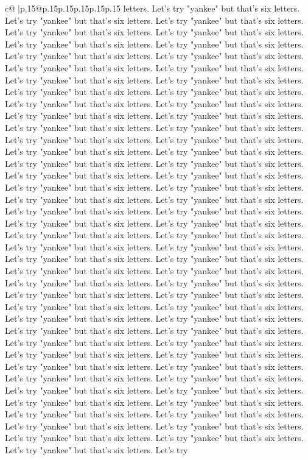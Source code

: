 \documentclass{article}
\begin{document}
{\begin{supertabular}{c@{$\;$}|p{.15\linewidth}@{}p{.15\linewidth}p{.15\linewidth}p{.15\linewidth}p{.15\linewidth}p{.15\linewidth}}
{{{letters. Let's try "yankee" but that's six letters. Let's try "yankee" but that's six letters. Let's try "yankee" but that's six letters. Let's try "yankee" but that's six letters. Let's try "yankee" but that's six letters. Let's try "yankee" but that's six letters. Let's try "yankee" but that's six letters. Let's try "yankee" but that's six letters. Let's try "yankee" but that's six letters. Let's try "yankee" but that's six letters. Let's try "yankee" but that's six letters. Let's try "yankee" but that's six letters. Let's try "yankee" but that's six letters. Let's try "yankee" but that's six letters. Let's try "yankee" but that's six letters. Let's try "yankee" but that's six letters. Let's try "yankee" but that's six letters. Let's try "yankee" but that's six letters. Let's try "yankee" but that's six letters. Let's try "yankee" but that's six letters. Let's try "yankee" but that's six letters. Let's try "yankee" but that's six letters. Let's try "yankee" but that's six letters. Let's try "yankee" but that's six letters. Let's try "yankee" but that's six letters. Let's try "yankee" but that's six letters. Let's try "yankee" but that's six letters. Let's try "yankee" but that's six letters. Let's try "yankee" but that's six letters. Let's try "yankee" but that's six letters. Let's try "yankee" but that's six letters. Let's try "yankee" but that's six letters. Let's try "yankee" but that's six letters. Let's try "yankee" but that's six letters. Let's try "yankee" but that's six letters. Let's try "yankee" but that's six letters. Let's try "yankee" but that's six letters. Let's try "yankee" but that's six letters. Let's try "yankee" but that's six letters. Let's try "yankee" but that's six letters. Let's try "yankee" but that's six letters. Let's try "yankee" but that's six letters. Let's try "yankee" but that's six letters. Let's try "yankee" but that's six letters. Let's try "yankee" but that's six letters. Let's try "yankee" but that's six letters. Let's try "yankee" but that's six letters. Let's try "yankee" but that's six letters. Let's try "yankee" but that's six letters. Let's try "yankee" but that's six letters. Let's try "yankee" but that's six letters. Let's try "yankee" but that's six letters. Let's try "yankee" but that's six letters. Let's try "yankee" but that's six letters. Let's try "yankee" but that's six letters. Let's try "yankee" but that's six letters. Let's try "yankee" but that's six letters. Let's try "yankee" but that's six letters. Let's try "yankee" but that's six letters. Let's try "yankee" but that's six letters. Let's try "yankee" but that's six letters. Let's try "yankee" but that's six letters. Let's try "yankee" but that's six letters. Let's try "yankee" but that's six letters. Let's try "yankee" but that's six letters. Let's try "yankee" but that's six letters. Let's try "yankee" but that's six letters. Let's try "yankee" but that's six letters. Let's try "yankee" but that's six letters. Let's try "yankee" but that's six letters. Let's try "yankee" but that's six letters. Let's try "yankee" but that's six letters. Let's try "yankee" but that's six letters. Let's try "yankee" but that's six letters. Let's try }}}
\end{supertabular}}
\end{document}
